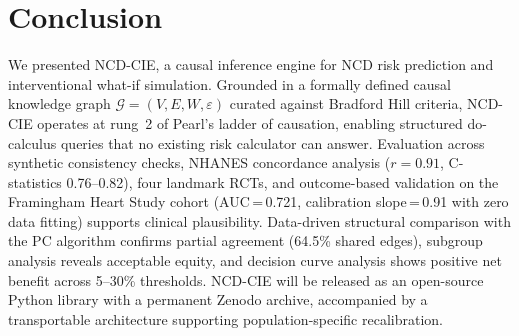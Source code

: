 \documentclass[runningheads]{llncs}
\begin{document}
\section{Conclusion}\label{sec:conclusion}

We presented NCD-CIE, a causal inference engine for NCD risk
prediction and interventional what-if simulation.  Grounded in a
formally defined causal knowledge graph
$\mathcal{G} = (V, E, W, \varepsilon)$ curated against Bradford Hill
criteria, NCD-CIE operates at rung~2 of Pearl's ladder of causation,
enabling structured do-calculus queries that no existing risk
calculator can answer.  Evaluation across synthetic consistency checks,
NHANES concordance analysis ($r = 0.91$, C-statistics 0.76--0.82),
four landmark RCTs, and outcome-based validation on the Framingham
Heart Study cohort (AUC\,=\,0.721, calibration slope\,=\,0.91 with zero data fitting) supports
clinical plausibility.  Data-driven
structural comparison with the PC algorithm confirms partial agreement
(64.5\% shared edges), subgroup analysis reveals acceptable equity,
and decision curve analysis shows positive net benefit across 5--30\%
thresholds.  NCD-CIE will be released as an open-source
Python library with a permanent Zenodo archive, accompanied by a
transportable architecture supporting population-specific
recalibration.
\end{document}
